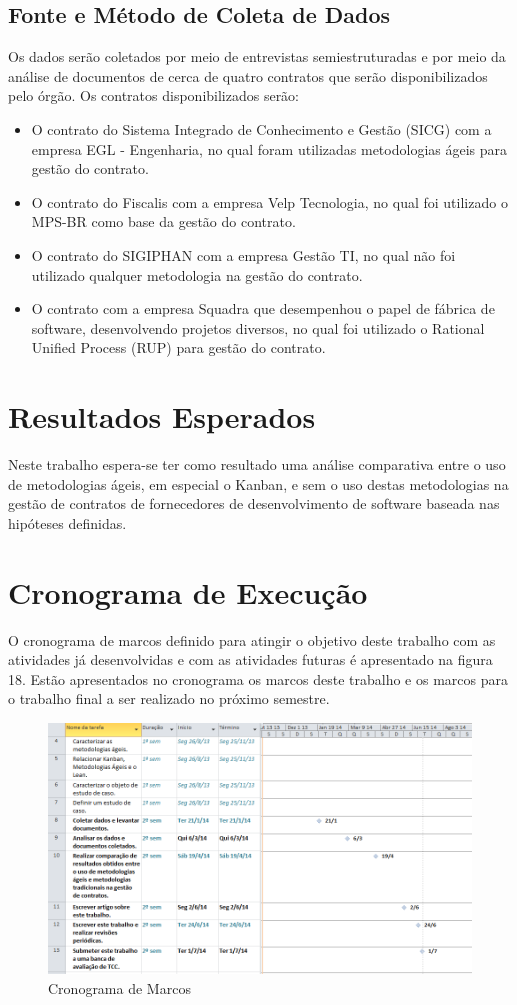 \subsection[Fonte e Método Coleta de Dados]{Fonte e Método de Coleta de Dados}

Os dados serão coletados por meio de entrevistas semiestruturadas e por meio da análise de documentos de cerca de quatro contratos que serão disponibilizados pelo órgão. Os contratos disponibilizados serão:
\begin{itemize}
\item  O contrato do Sistema Integrado de Conhecimento e Gestão (SICG) com a empresa EGL - Engenharia, no qual foram utilizadas metodologias ágeis para gestão do contrato.
\item  O contrato do Fiscalis com a empresa Velp Tecnologia, no qual foi utilizado o MPS-BR como base da gestão do contrato.
\item  O contrato do SIGIPHAN com a empresa Gestão TI, no qual não foi utilizado qualquer metodologia na gestão do contrato.
\item  O contrato com a empresa Squadra que desempenhou o papel de fábrica de software, desenvolvendo projetos diversos, no qual foi utilizado o Rational Unified Process (RUP) para gestão do contrato.
\end{itemize}

\section[Resultados Esperados]{Resultados Esperados}

Neste trabalho espera-se ter como resultado uma análise comparativa entre o uso de metodologias ágeis, em especial o Kanban, e sem o uso destas metodologias na gestão de contratos de fornecedores de desenvolvimento de software baseada nas hipóteses definidas.

\section[Cronograma de Execução]{Cronograma de Execução}

O cronograma de marcos definido para atingir o objetivo deste trabalho com as atividades já desenvolvidas e com as atividades futuras é apresentado na figura 18. Estão apresentados  no cronograma os marcos deste trabalho e os marcos para o trabalho final a ser realizado no próximo semestre.

\begin{figure}[H]
		\centering
		\label{fig02}
			\includegraphics[scale=0.6]{figuras/cronograma2.png}
		\caption{Cronograma de Marcos}
\end{figure}
